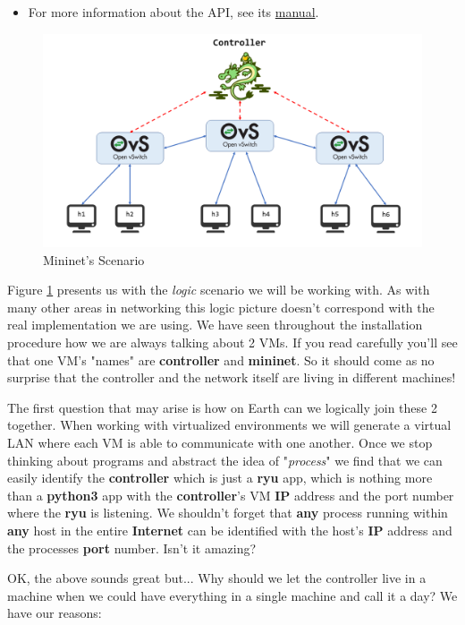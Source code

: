 \documentclass[12pt]{report}
\newcommand{\newpar} {
    \vskip 1cm
}
\begin{document}
		\begin{itemize}
			\item For more information about the API, see its \href{http://mininet.org/api/annotated.html}{manual}.
		\end{itemize}

		\begin{figure}
			\centering
			\includegraphics[scale = 1]{scenario.png}
			\caption{Mininet's Scenario}
			\label{f:scenario}
		\end{figure}

		Figure \ref{f:scenario} presents us with the \textit{logic} scenario we will be working with. As with many other areas in networking this logic picture doesn't correspond with the real implementation we are using. We have seen throughout the installation procedure how we are always talking about 2 VMs. If you read carefully you'll see that one VM's "names" are \textbf{controller} and \textbf{mininet}. So it should come as no surprise that the controller and the network itself are living in different machines!
		\newpar
		The first question that may arise is how on Earth can we logically join these 2 together. When working with virtualized environments we will generate a virtual LAN where each VM is able to communicate with one another. Once we stop thinking about programs and abstract the idea of "\textit{process}" we find that we can easily identify the \textbf{controller} which is just a \textbf{ryu} app, which is nothing more than a \textbf{python3} app with the \textbf{controller}'s VM \textbf{IP} address and the port number where the \textbf{ryu} is listening. We shouldn't forget that \textbf{any} process running within \textbf{any} host in the entire \textbf{Internet} can be identified with the host's \textbf{IP} address and the processes \textbf{port} number. Isn't it amazing?
		\newpar
		OK, the above sounds great but... Why should we let the controller live in a machine when we could have everything in a single machine and call it a day? We have our reasons:
\end{document}
